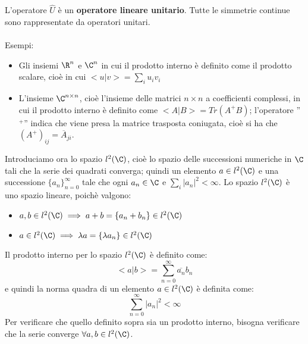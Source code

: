 L'operatore $\hat{U}$ è un \textbf{operatore lineare unitario}. Tutte le simmetrie continue sono rappresentate da operatori unitari.
\\
\\
Esempi:
\begin{itemize}
\item Gli insiemi $\R^n$ e $\C^n$ in cui il prodotto interno è definito come il prodotto scalare, cioè in cui $<u|v>=\sum_i u_i v_i$
\item L'insieme $\C^{n \times n}$, cioè l'insieme delle matrici $n \times n$ a coefficienti complessi, in cui il prodotto interno è definito come $<A|B>=Tr(A^+ B)$; l'operatore ''$^+$'' indica che viene presa la matrice trasposta coniugata, cioè si ha che $(A^+)_{ij}=\overline{A}_{ji}$.
\end{itemize}

Introduciamo ora lo spazio $l^2(\C)$, cioè lo spazio delle successioni numeriche in $\C$ tali che la serie dei quadrati converga; quindi un elemento  $a \in l^2(\C)$ e una successione $\{ a_n\}_{n=0} ^{\infty}$ tale che ogni $a_n \in \C$ e $\sum_i |a_n|^2 < \infty$. Lo spazio $l^2(\C)$ è uno spazio lineare, poichè valgono: 
\begin{itemize}
\item $a,b \in l^2(\C) \implies a+b=\{a_n + b_n\} \in l^2(\C)$
\item $a \in l^2(\C) \implies \lambda a=\{ \lambda a_n\} \in l^2(\C)$
\end{itemize}
Il prodotto interno per lo spazio $l^2(\C)$ è definito come:
$$<a|b> = \sum_{n=0} ^{\infty} \overline{a_n} b_n$$
e quindi la norma quadra di un elemento $a \in l^2(\C)$ è definita come:
$$\sum_{n=0} ^{\infty} |a_n|^2 < \infty$$
Per verificare che quello definito sopra sia un prodotto interno, bisogna verificare che la serie converge $\forall a,b \in l^2(\C)$.


